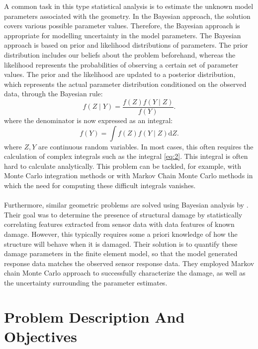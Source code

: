 \documentclass[12pt]{report}
\begin{document}
A common task in this type statistical analysis is to estimate the unknown model parameters associated with the geometry. In the Bayesian approach, the solution covers various possible parameter values\cite{Hoff,Gilks}. Therefore, the Bayesian approach is appropriate for modelling uncertainty in the model parameters. The Bayesian approach is based on prior and likelihood distributions of parameters. The prior distribution includes our beliefs about the problem beforehand, whereas the likelihood represents the probabilities of observing a certain set of parameter values\cite{Hoff,Gilks}. The prior and the likelihood are updated to a posterior distribution, which represents the actual parameter distribution conditioned on the observed data, through the Bayesian rule:
\begin{equation}
\label{eq:1}
f(Z\mid Y)=\frac{f(Z)f(Y\mid Z)}{f(Y)}.
\end{equation}
where the denominator is now expressed as an integral:
\begin{equation}
\label{eq:2}
f(Y)=\int f(Z)f(Y\mid Z)\mathrm{d}Z.
\end{equation}
where $Z,Y$ are continuous random variables. In most cases, this often requires the calculation of complex integrals such as the integral \ref{eq:2}. This integral is often hard to calculate analytically. This problem can be tackled, for example, with Monte Carlo integration methods\cite{Hoff,Gilks} or with Markov Chain Monte Carlo methods\cite{Hoff,Gilks} in which the need for computing these difficult integrals vanishes. 
\\
\\
Furthermore, similar geometric problems are solved using Bayesian analysis by \citet{Lin2017,Reed2015,Earls2013}. Their goal was to determine the presence of structural damage by statistically correlating features extracted from sensor data with data features of known damage. However, this typically requires some a priori knowledge of how the structure will behave when it is damaged. Their solution is to quantify these damage parameters in the finite
element model, so that the model generated response data matches the observed sensor response data. They employed Markov chain Monte Carlo approach\cite{Gilks,Lin2017,Reed2015,Earls2013,Hoff} to successfully characterize the damage, as well as the uncertainty surrounding the parameter estimates.

\newpage
\section{Problem Description And Objectives}
\end{document}
